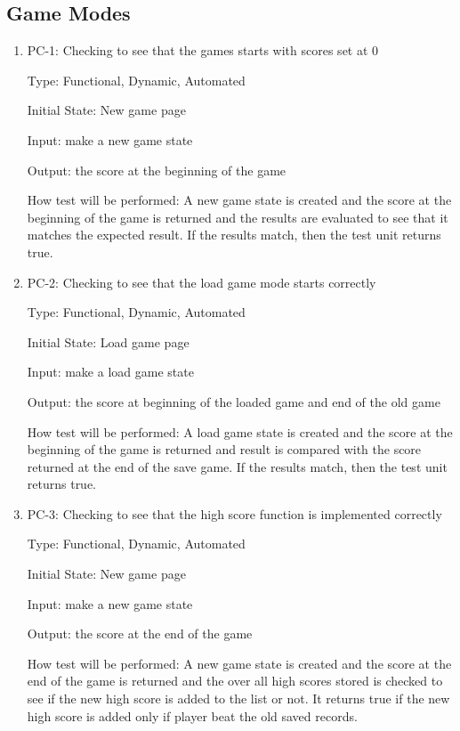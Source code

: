 \documentclass[12pt,letterpaper]{article}
\begin{document}
	\subsection{Game Modes}
	\begin{enumerate}
	\item PC-1: Checking to see that the games starts with scores set at 0

	Type: Functional, Dynamic, Automated

	Initial State: New game page

	Input: make a new game state
	
	Output: the score at the beginning of the game

	How test will be performed: A new game state is created and the score at the beginning of the game is returned and the results are evaluated to see that it matches the expected result. If the results match, then the test unit returns true.

	\item PC-2: Checking to see that the load game mode starts correctly

	Type: Functional, Dynamic, Automated
	
	Initial State: Load game page
	
	Input: make a load game state
	
	Output: the score at beginning of the loaded game and end of the old game

	How test will be performed: A load game state is created and the score at the beginning of the game is returned and result is compared with the score returned at the end of the save game. If the results match, then the test unit returns true.

	\item PC-3: Checking to see that the high score function is implemented correctly

	Type: Functional, Dynamic, Automated

	Initial State: New game page

	Input: make a new game state

	Output: the score at the end of the game

	How test will be performed: A new game state is created and the score at the end of the game is returned and the over all high scores stored is checked to see if the new high score is added to the list or not. It returns true if the new high score is added only if player beat the old saved records.	
	\end{enumerate}
\end{document}
